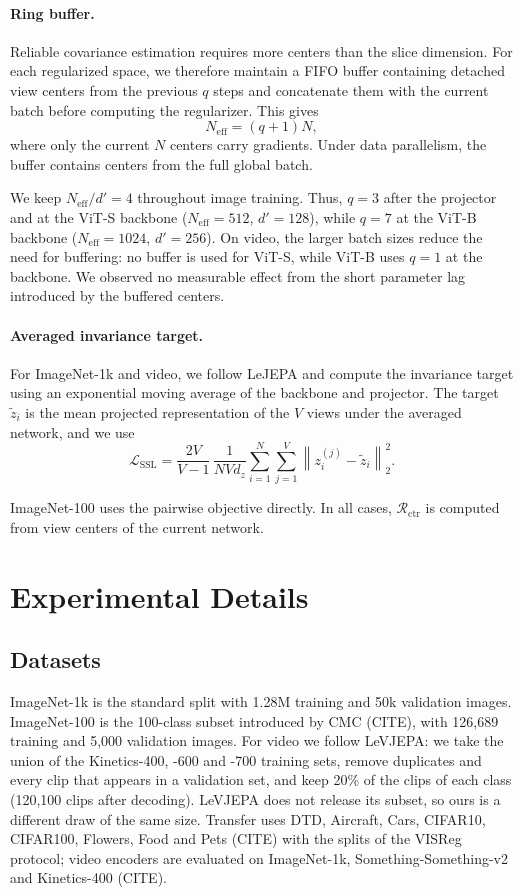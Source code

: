 \documentclass{article} %
\theoremstyle{remark}
\begin{document}
\paragraph{Ring buffer.}
Reliable covariance estimation requires more centers than the slice dimension.
For each regularized space, we therefore maintain a FIFO buffer containing detached view centers from the previous $q$ steps and concatenate them with the current batch before computing the regularizer.
This gives
\[
N_{\mathrm{eff}}=(q+1)N,
\]
where only the current $N$ centers carry gradients.
Under data parallelism, the buffer contains centers from the full global batch.

We keep $N_{\mathrm{eff}}/d'=4$ throughout image training.
Thus, $q=3$ after the projector and at the ViT-S backbone
($N_{\mathrm{eff}}=512$, $d'=128$), while $q=7$ at the ViT-B backbone
($N_{\mathrm{eff}}=1024$, $d'=256$).
On video, the larger batch sizes reduce the need for buffering:
no buffer is used for ViT-S, while ViT-B uses $q=1$ at the backbone.
We observed no measurable effect from the short parameter lag introduced by the buffered centers.

\paragraph{Averaged invariance target.}
For ImageNet-1k and video, we follow LeJEPA and compute the invariance target using an exponential moving average of the backbone and projector. The target $\tilde z_i$ is the mean projected representation of the $V$ views under the averaged network, and we use
\[
\mathcal L_{\mathrm{SSL}}
=
\frac{2V}{V-1}\,
\frac{1}{N V d_z}
\sum_{i=1}^{N}\sum_{j=1}^{V}
\left\|z_i^{(j)}-\tilde z_i\right\|_2^2 .
\]

ImageNet-100 uses the pairwise objective directly. In all cases, $\mathcal R_{\mathrm{ctr}}$ is computed from view centers of the current network.



\section{Experimental Details}
\label{app:exp-details}

\subsection{Datasets}
ImageNet-1k is the standard split with 1.28M training and 50k validation images. ImageNet-100 is the 100-class subset introduced by CMC (CITE), with 126{,}689 training and 5{,}000 validation images. For video we follow LeVJEPA: we take the union of the Kinetics-400, -600 and -700 training sets, remove duplicates and every clip that appears in a validation set, and keep 20\% of the clips of each class (120{,}100 clips after decoding). LeVJEPA does not release its subset, so ours is a different draw of the same size. Transfer uses DTD, Aircraft, Cars, CIFAR10, CIFAR100, Flowers, Food and Pets (CITE) with the splits of the VISReg protocol; video encoders are evaluated on ImageNet-1k, Something-Something-v2 and Kinetics-400 (CITE).
\end{document}
